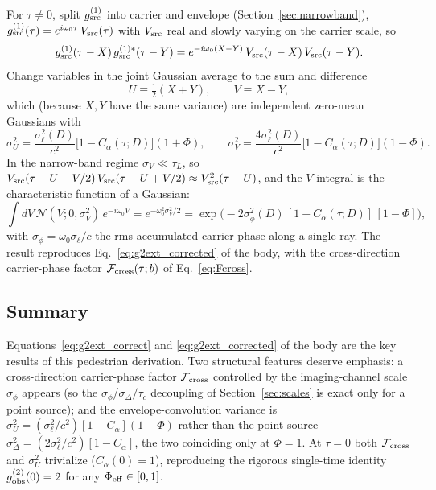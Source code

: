 \documentclass[aps,prd,onecolumn,amsmath,amssymb]{revtex4-2}
\begin{document}
For $\tau\neq 0$, split $g^{(1)}_{\rm src}$ into carrier and envelope
(Section~\ref{sec:narrowband}),
$g^{(1)}_{\rm src}(\tau) = e^{i\omega_0\tau}\,V_{\rm src}(\tau)$ with
$V_{\rm src}$ real and slowly varying on the carrier scale, so
\begin{equation}
  g^{(1)}_{\rm src}(\tau-X)\,g^{(1)*}_{\rm src}(\tau-Y)
  = e^{-i\omega_0(X-Y)}\,V_{\rm src}(\tau-X)\,V_{\rm src}(\tau-Y).
\end{equation}
Change variables in the joint Gaussian average to the sum and difference
\begin{equation}
  U \equiv \tfrac{1}{2}(X+Y),\qquad V \equiv X - Y,
\end{equation}
which (because $X,Y$ have the same variance) are independent zero-mean
Gaussians with
\begin{equation}
  \sigma_U^2 = \frac{\sigma_\ell^2(D)}{c^2}\big[1-C_\alpha(\tau;D)\big](1+\Phi),
  \qquad
  \sigma_V^2 = \frac{4\sigma_\ell^2(D)}{c^2}\big[1-C_\alpha(\tau;D)\big](1-\Phi).
  \label{eq:sigmaUV}
\end{equation}
In the narrow-band regime $\sigma_V\ll\tau_L$, so
$V_{\rm src}(\tau-U-V/2)\,V_{\rm src}(\tau-U+V/2) \approx
V_{\rm src}^2(\tau-U)$, and the $V$ integral is the characteristic
function of a Gaussian:
\begin{equation}
  \int dV\,\mathcal{N}(V;0,\sigma_V^2)\,e^{-i\omega_0 V}
  = e^{-\omega_0^2\sigma_V^2/2}
  = \exp\!\Big(-2\sigma_\phi^2(D)\,[1-C_\alpha(\tau;D)]\,[1-\Phi]\Big),
\end{equation}
with $\sigma_\phi = \omega_0\sigma_\ell/c$ the rms accumulated carrier
phase along a single ray.  The result reproduces Eq.~\eqref{eq:g2ext_corrected}
of the body, with the cross-direction carrier-phase factor
$\mathcal{F}_{\rm cross}(\tau;b)$ of Eq.~\eqref{eq:Fcross}.

\subsection{Summary}

Equations~\eqref{eq:g2ext_correct} and \eqref{eq:g2ext_corrected} of the
body are the key results of this pedestrian derivation.  Two structural
features deserve emphasis: a cross-direction carrier-phase factor
$\mathcal{F}_{\rm cross}$ controlled by the imaging-channel scale
$\sigma_\phi$ appears (so the $\sigma_\phi$/$\sigma_\Delta/\tau_c$
decoupling of Section~\ref{sec:scales} is exact only for a point source);
and the envelope-convolution variance is $\sigma_U^2 =
(\sigma_\ell^2/c^2)[1-C_\alpha](1+\Phi)$ rather than the point-source
$\sigma_\Delta^2 = (2\sigma_\ell^2/c^2)[1-C_\alpha]$, the two coinciding
only at $\Phi=1$.  At $\tau=0$ both $\mathcal{F}_{\rm cross}$ and
$\sigma_U^2$ trivialize ($C_\alpha(0)=1$), reproducing the rigorous
single-time identity $g^{(2)}_{\rm obs}(0) = 2$ for any
$\Phi_{\rm eff}\in[0,1]$.



\end{document}
